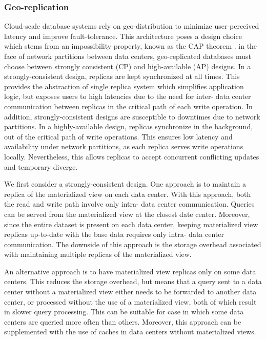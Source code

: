 \subsubsection{Geo-replication}
Cloud-scale database systems rely on geo-distribution to minimize user-perceived latency and improve fault-tolerance.
This architecture poses a design choice which stems from an impossibility property, known as the CAP theorem
\cite{brewer:cap}.
in the face of network partitions between data centers, geo-replicated databases must choose between strongly consistent
(CP) and high-available (AP) designs.
In a strongly-consistent design, replicas are kept synchronized at all times.
This provides the abstraction of single replica system which simplifies application logic, but exposes users to high
latencies due to the need for inter- data center communication between replicas in the critical path of each write
operation.
In addition, strongly-consistent designs are susceptible to downtimes due to network partitions.
In a highly-available design, replicas synchronize in the background, out of the critical path of write operations.
This ensures low latency and availability under network partitions, as each replica serves write operations locally.
Nevertheless, this allows replicas to accept concurrent conflicting updates and temporary diverge.

\medskip

We first consider a strongly-consistent design.
One approach is to maintain a replica of the materialized view on each data center.
With this approach, both the read and write path involve only intra- data center communication.
Queries can be served from the materialized view at the closest date center.
Moreover, since the entire dataset is present on each data center,
keeping materialized view replicas up-to-date with the base data requires only intra- data center communication.
The downside of this approach is the storage overhead associated with maintaining multiple replicas of the materialized
view.

An alternative approach is to have materialized view replicas only on some data centers.
This reduces the storage overhead, but means that a query sent to a data center without a materialized view
either needs to be forwarded to another data center, or processed without the use of a materialized view,
both of which result in slower query processing.
This can be suitable for case in which some data centers are queried more often than others.
Moreover, this approach can be supplemented with the use of caches in data centers without materialized
views.

